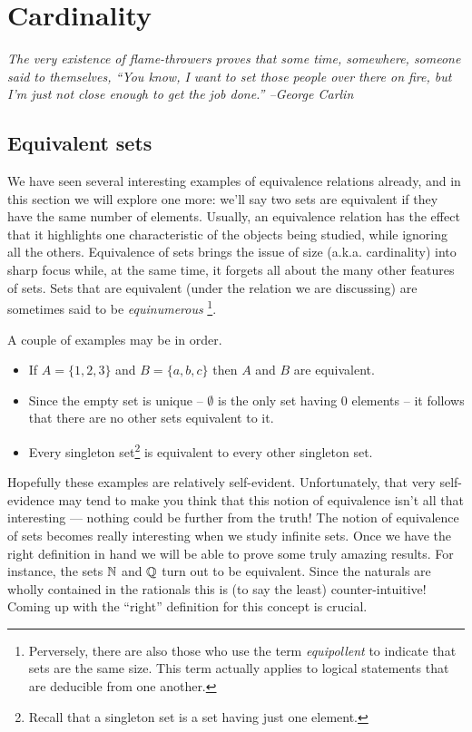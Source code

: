 
\chapter{Cardinality}
\label{ch:card}

{\em The very existence of flame-throwers proves that some time, 
somewhere, someone said to themselves, ``You know, I want to set 
those people over there on fire, but I'm just not close enough 
to get the job done.'' --George Carlin}

\section{Equivalent sets}
\label{sec:equiv_sets}

We have seen several interesting examples of equivalence relations 
already, and in this section we will explore one more: we'll say two sets are equivalent
if they have the same number of elements. Usually, an equivalence relation
has the effect that it highlights one characteristic of the objects being studied,
while ignoring all the others. Equivalence of sets brings the issue of size (a.k.a.
cardinality) into sharp focus while, at the same time, it forgets all about the
many other features of sets. Sets that are equivalent (under the relation we
are discussing) are sometimes said to be 
\emph{equinumerous}
\footnote{Perversely, there are also those who use the term \emph{equipollent} 
to indicate that sets are the same size. This term actually applies to 
logical statements that are deducible from one another.}.

A couple of examples may be in order.

\begin{itemize}
\item If $A = \{1, 2, 3\}$ and $B = \{a, b, c\}$ then $A$ and $B$ are equivalent.
\item Since the empty set is unique -- $\emptyset$ is the only set having 0 elements -- it
follows that there are no other sets equivalent to it.
\item Every singleton set\footnote{Recall that a 
singleton set is a set having just one element.} 
is equivalent to every other singleton set.
\end{itemize}

Hopefully these examples are relatively self-evident. Unfortunately, that
very self-evidence may tend to make you think that this notion of equivalence
isn't all that interesting ---  nothing could be further from the truth! The
notion of equivalence of sets becomes really interesting when we study infinite
sets. Once we have the right definition in hand we will be able to prove
some truly amazing results. For instance, the sets ${\mathbb N}$ and ${\mathbb Q}$ turn out to be equivalent. Since the naturals are wholly contained in the rationals this is (to say the least) counter-intuitive! Coming up with the ``right'' definition for this concept is crucial.

